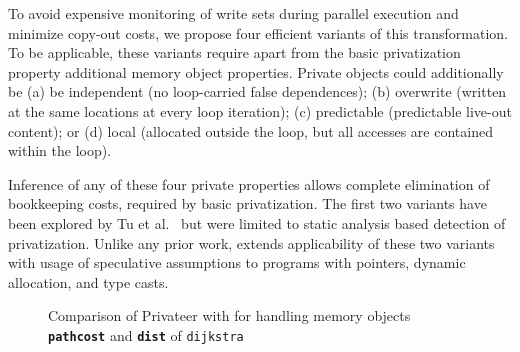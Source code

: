 To avoid expensive monitoring of write sets during parallel execution
and minimize copy-out costs, we propose four efficient variants of
this transformation.
%
To be applicable, these variants require apart from the basic
privatization property additional memory object properties.  Private
objects could additionally be (a) be independent (no loop-carried false
dependences); (b) overwrite (written at the same locations at every
loop iteration); (c) predictable (predictable live-out content);
or (d) local (allocated outside the loop, but all accesses are
contained within the loop).

Inference of any of these four private properties allows complete
elimination of bookkeeping costs, required by basic privatization.
The first two variants have been explored by Tu et
al.~\cite{tu:94:lcpc} but were limited to static analysis based
detection of privatization. Unlike any prior work, \name extends
applicability of these two variants with usage of speculative
assumptions to programs with pointers, dynamic allocation, and type
casts.





\lstset{basicstyle=\ttfamily, numbers=left, numberstyle=\tiny,
  stepnumber=1, numbersep=5pt}

\begin{figure}[!t]
\centering
{}
\caption{Comparison of Privateer with \name for handling memory
objects \texttt{\textbf{pathcost}} and \texttt{\textbf{dist}} of \texttt{dijkstra}}
\label{fig:dijkstra_motivation_comparison}
\end{figure}

